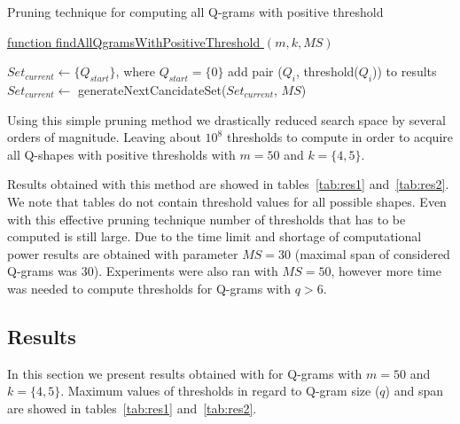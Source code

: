 \documentclass[paper=a4, fontsize=11pt]{scrartcl} %
\numberwithin{equation}{section} %
\numberwithin{figure}{section} %
\numberwithin{table}{section} %
\begin{document}
\begin{algorithm}[H]
\caption{Pruning technique for computing all Q-grams with positive threshold}
\label{alg:pruningLoop}

\underline{function findAllQgramsWithPositiveThreshold } $(m,k,MS)$\;



\begin{algorithmic}
	\STATE $Set_{current} \gets \{Q_{start}\}$, where $Q_{start} = \{0\}$
			\STATE add pair ($Q_{i}$, threshold($Q_{i}$)) to results
			\ENDIF
			\STATE $Set_{current} \gets$ generateNextCancidateSet($Set_{current}$, $MS$)
		\ENDFOR	
\end{algorithmic}

\end{algorithm}

Using this simple pruning method we drastically reduced search space by several
orders of magnitude. Leaving about $10^{8}$ thresholds to compute in order to
acquire all Q-shapes with positive thresholds with $m=50$ and $k=\{4,5\}$.


Results obtained with this method are showed in tables~\ref{tab:res1}
and~\ref{tab:res2}. We note that tables do not contain threshold values for all
possible shapes. Even with this effective pruning technique number of thresholds
that has to be computed is still large. Due to the time limit and
shortage of computational power results are obtained with parameter $MS = 30$
(maximal span of considered Q-grams was $30$). Experiments were also ran with
$MS = 50$, however more time was needed to compute thresholds for Q-grams
with $q > 6$.


\subsection{Results}

In this section we present results obtained with for Q-grams with $m=50$ and
$k=\{4,5\}$. Maximum values of thresholds in regard to Q-gram size ($q$) and
span are showed in tables~\ref{tab:res1} and~\ref{tab:res2}.
\end{document}
